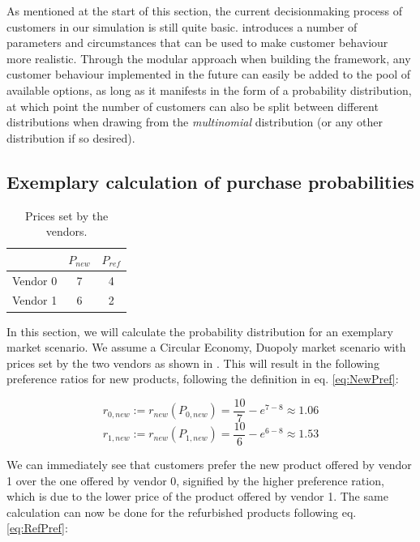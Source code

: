As mentioned at the start of this section, the current decisionmaking process of customers in our simulation is still quite basic.  introduces a number of parameters and circumstances that can be used to make customer behaviour more realistic. Through the modular approach when building the framework, any customer behaviour implemented in the future can easily be added to the pool of available options, as long as it manifests in the form of a probability distribution, at which point the number of customers can also be split between different distributions when drawing from the \emph{multinomial} distribution (or any other distribution if so desired).

\subsection{Exemplary calculation of purchase probabilities}\label{subsec:customerPropExample}

\begin{table}
	\begin{tabular}{|r|c|c|}
		\hline
		         & \(P_{new}\) & \(P_{ref}\) \\\hline
		Vendor 0 & 7           & 4           \\\hline
		Vendor 1 & 6           & 2           \\\hline
	\end{tabular}
	\caption{Prices set by the vendors.}\label{tab:CustomerExamplePrices}
\end{table}

In this section, we will calculate the probability distribution for an exemplary market scenario. We assume a Circular Economy, Duopoly market scenario with prices set by the two vendors as shown in . This will result in the following preference ratios for new products, following the definition in eq. \eqref{eq:NewPref}:

\begin{equation}
	r_{0,new} := r_{new}(P_{0,new}) = \frac{10}{7} - e^{7 - 8} \approx 1.06
\end{equation}
\begin{equation}
	r_{1,new} := r_{new}(P_{1,new}) = \frac{10}{6} - e^{6 - 8} \approx 1.53
\end{equation}

We can immediately see that customers prefer the new product offered by vendor 1 over the one offered by vendor 0, signified by the higher preference ration, which is due to the lower price of the product offered by vendor 1. The same calculation can now be done for the refurbished products following eq. \eqref{eq:RefPref}:

